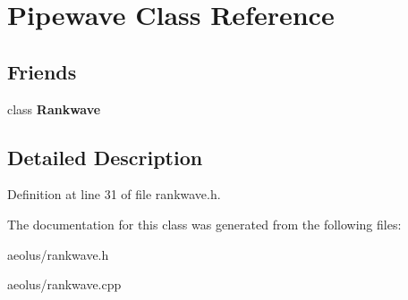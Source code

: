 \hypertarget{class_pipewave}{}\section{Pipewave Class Reference}
\label{class_pipewave}
\subsection*{Friends}
\begin{DoxyCompactItemize}
\item 
\mbox{\label{class_pipewave_a5f93aa67a6b2858c697054e5b834376d}} 
class {\bfseries Rankwave}
\end{DoxyCompactItemize}


\subsection{Detailed Description}


Definition at line 31 of file rankwave.\+h.



The documentation for this class was generated from the following files\+:\begin{DoxyCompactItemize}
\item 
aeolus/rankwave.\+h\item 
aeolus/rankwave.\+cpp\end{DoxyCompactItemize}

